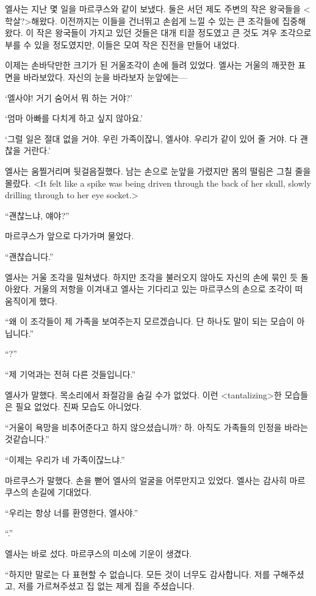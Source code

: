 엘사는 지난 몇 일을 마르쿠스와 같이 보냈다. 둘은 서던 제도 주변의 작은 왕국들을 <학살?\slaughter>해왔다. 이전까지는 이들을 건너뛰고 손쉽게 느낄 수 있는 큰 조각들에 집중해 왔다. 이 작은 왕국들이 가지고 있던 것들은 대개 티끌 정도였고 큰 것도 겨우 조각으로 부를 수 있을 정도였지만, 이들은 모여 작은 진전을 만들어 내었다.

이제는 손바닥만한 크기가 된 거울조각이 손에 들려 있었다. 엘사는 거울의 깨끗한 표면을 바라보았다. 자신의 눈을 바라보자 눈앞에는—

`엘사야! 거기 숨어서 뭐 하는 거야?'

`엄마 아빠를 다치게 하고 싶지 않아요.'

`그럴 일은 절대 없을 거야. 우린 가족이잖니, 엘사야. 우리가 같이 있어 줄 거야. 다 괜찮을 거란다.'

엘사는 움찔거리며 뒷걸음질했다. 남는 손으로 눈앞을 가렸지만 몸의 떨림은 그칠 줄을 몰랐다. <It felt like a spike was being driven through the back of her skull, slowly drilling through to her eye socket.>

``괜찮느냐, 얘야?''

마르쿠스가 앞으로 다가가며 물었다.

``괜찮습니다.''

엘사는 거울 조각을 밀쳐냈다. 하지만 조각을 불러오지 않아도 자신의 손에 묶인 듯 돌아왔다. 거울의 저항을 이겨내고 엘사는 기다리고 있는 마르쿠스의 손으로 조각이 떠 움직이게 했다.

``왜 이 조각들이 제 가족을 보여주는지 모르겠습니다. 단 하나도 말이 되는 모습이 아닙니다.''

``?''

``제 기억과는 전혀 다른 것들입니다.''

엘사가 말했다. 목소리에서 좌절감을 숨길 수가 없었다. 이런 <tantalizing>한 모습들은 필요 없었다. 진짜 모습도 아니었다.

``거울이 욕망을 비추어준다고 하지 않으셨습니까? 하. 아직도 가족들의 인정을 바라는 것같습니다.''

``이제는 우리가 네 가족이잖느냐.''

마르쿠스가 말했다. 손을 뻗어 엘사의 얼굴을 어루만지고 있었다. 엘사는 감사히 마르쿠스의 손길에 기대었다.

``우리는 항상 너를 환영한다, 엘사야.''

``.''

엘사는 바로 섰다. 마르쿠스의 미소에 기운이 생겼다.

``하지만 말로는 다 표현할 수 없습니다. 모든 것이 너무도 감사합니다. 저를 구해주셨고, 저를 가르쳐주셨고 집 없는 제게 집을 주셨습니다. %

